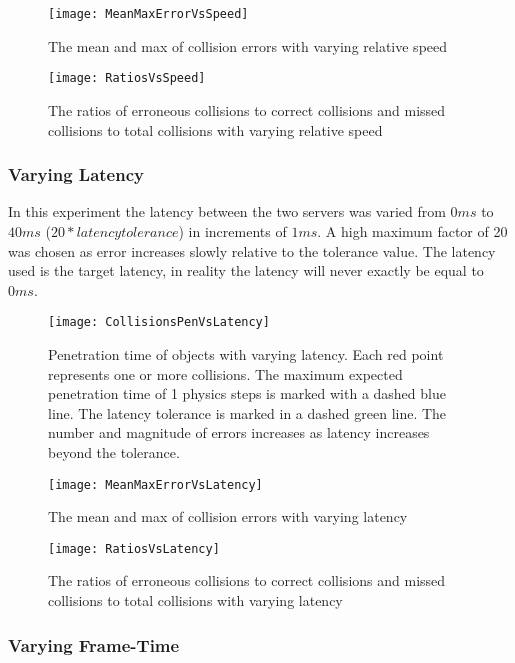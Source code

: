 \begin{figure}
\centering
\texttt{[image: MeanMaxErrorVsSpeed]}
\caption{The mean and max of collision errors with varying relative speed}
\label{fig_MeanMaxErrorVsSpeed}
\end{figure}

\begin{figure}
\centering
\texttt{[image: RatiosVsSpeed]}
\caption{The ratios of erroneous collisions to correct collisions and missed collisions to total collisions with varying relative speed}
\label{fig_RatiosVsSpeed}
\end{figure}

\subsubsection{Varying Latency}

In this experiment the latency between the two servers was varied from $0ms$ to $40ms$ ($20*latency tolerance$) in increments of $1ms$. A high maximum factor of 20 was chosen as error increases slowly relative to the tolerance value. The latency used is the target latency, in reality the latency will never exactly be equal to $0ms$.

\begin{figure}
\centering
\texttt{[image: CollisionsPenVsLatency]}
\caption{Penetration time of objects with varying latency. Each red point represents one or more collisions. The maximum expected penetration time of 1 physics steps is marked with a dashed blue line. The latency tolerance is marked in a dashed green line. The number and magnitude of errors increases as latency increases beyond the tolerance.}
\label{fig_CollisionsPenVsLatency}
\end{figure}

\begin{figure}
\centering
\texttt{[image: MeanMaxErrorVsLatency]}
\caption{The mean and max of collision errors with varying latency}
\label{fig_MeanMaxErrorVsLatency}
\end{figure}

\begin{figure}
\centering
\texttt{[image: RatiosVsLatency]}
\caption{The ratios of erroneous collisions to correct collisions and missed collisions to total collisions with varying latency}
\label{fig_RatiosVsLatency}
\end{figure}

\subsubsection{Varying Frame-Time}


